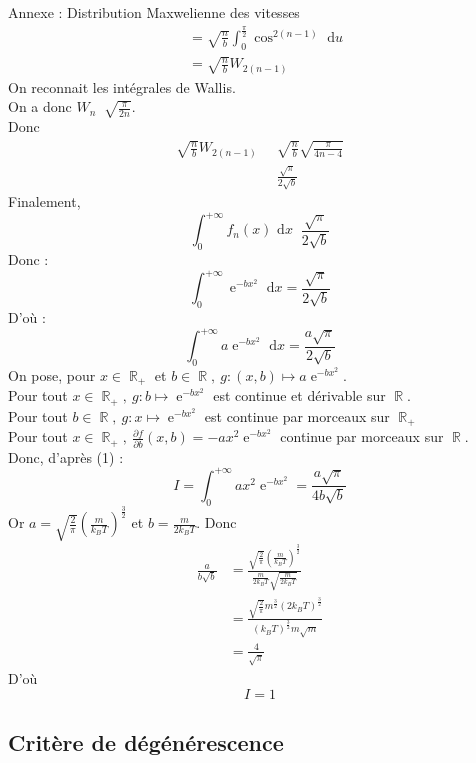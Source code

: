 \documentclass{beamer}
\newcommand{\dint}[1]{\text{ d}#1}
\DeclareMathOperator{\e}{\mathrm{e}}
\DeclareMathOperator{\simp}{\underset{+\infty}{\sim}}
\DeclareMathOperator{\R}{\mathbb{R}}
\begin{document}
\begin{frame}{Annexe : Distribution Maxwelienne des vitesses}
\begin{align*}
        &= \sqrt{\frac{n}{b}}\int_0^{\frac{\pi}{2}}\cos^{2(n-1)}\dint{u} \\
        &= \sqrt{\frac{n}{b}}W_{2(n-1)}
    \end{align*}
    On reconnait les intégrales de Wallis. \\
    On a donc $W_{n}\simp\sqrt{\frac{\pi}{2n}}$. \\
    Donc
    \begin{align*}
        \sqrt{\frac{n}{b}}W_{2(n-1)}&\simp\sqrt{\frac{n}{b}}\sqrt{\frac{\pi}{4n-4}} \\
        &\simp \frac{\sqrt{\pi}}{2\sqrt{b}}
    \end{align*}
    Finalement,
    \[ \int_0^{+\infty}f_n(x)\dint{x}\simp\frac{\sqrt{\pi}}{2\sqrt{b}} \]
    Donc :
    \[ \int_0^{+\infty}\e^{-bx^2}\dint{x} = \frac{\sqrt{\pi}}{2\sqrt{b}} \]
    D'où :
    \[ \int_0^{+\infty}a\e^{-bx^2}\dint{x} = \frac{a\sqrt{\pi}}{2\sqrt{b}} \tag{1} \]
    On pose, pour $x\in\R_+$ et $b\in\R,\ g:(x,b)\mapsto a\e^{-bx^2}$. \\
    Pour tout $x\in\R_+,\ g:b\mapsto\e^{-bx^2}$ est continue et dérivable sur $\R$. \\
    Pour tout $b\in\R,\ g:x\mapsto\e^{-bx^2}$ est continue par morceaux sur $\R_+$ \\
    Pour tout $x\in\R_+,\ \displaystyle\frac{\partial f}{\partial b}(x, b) = -ax^2\e^{-bx^2}$ continue par morceaux sur $\R$. \\
    Donc, d'après (1) :
    \[ I = \int_0^{+\infty}ax^2\e^{-bx^2} = \frac{a\sqrt{\pi}}{4b\sqrt{b}} \]
    Or $\displaystyle a=\sqrt{\frac{2}{\pi}}\left(\frac{m}{k_BT}\right)^\frac{3}{2}$ et $\displaystyle b=\frac{m}{2k_BT}$. Donc
    \begin{align*}
        \frac{a}{b\sqrt{b}} &= \frac{\sqrt{\frac{2}{\pi}}\left(\frac{m}{k_BT}\right)^\frac{3}{2}}{\frac{m}{2k_BT}\sqrt{\frac{m}{2k_BT}}} \\
        &= \frac{\sqrt{\frac{2}{\pi}}m^{\frac{3}{2}}(2k_BT)^{\frac{3}{2}}}{(k_BT)^{\frac{3}{2}}m\sqrt{m}} \\
        &= \frac{4}{\sqrt{\pi}}
    \end{align*}
    D'où
    \[ \boxed{I = 1} \]
\end{frame}

\subsection{Critère de dégénérescence}
\end{document}
